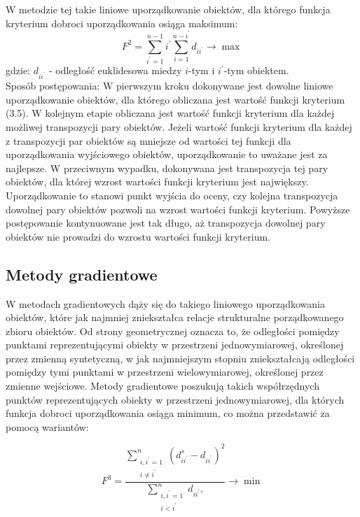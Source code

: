 \documentclass[12pt,a4paper]{report}
\begin{document}
W metodzie tej takie liniowe uporządkowanie obiektów, dla którego funkcja kryterium dobroci uporządkowania osiąga maksimum:
\begin{equation}
F^{2}=\sum_{i^{'}=1}^{n-1} i^{'}\sum_{i=1}^{n-i^{'}} d_{ii^{'}} \rightarrow     \max  
\end{equation}
gdzie:
\newline
$d_{ii^{'}}$ - odległość euklidesowa miedzy $i$-tym i $i^{'}$-tym obiektem.\\
Sposób postępowania:
\newline
W pierwszym kroku dokonywane jest dowolne liniowe uporządkowanie obiektów, dla którego obliczana jest wartość funkcji kryterium (3.5). W kolejnym etapie obliczana jest wartość funkcji kryterium dla każdej możliwej transpozycji pary obiektów. Jeżeli wartość funkcji kryterium dla każdej z transpozycji par obiektów są mniejsze od wartości tej funkcji dla uporządkowania wyjściowego obiektów, uporządkowanie to uważane jest za najlepsze. W przeciwnym wypadku, dokonywana jest transpozycja tej pary obiektów, dla której wzrost wartości funkcji kryterium jest największy. 
\newline
Uporządkowanie to stanowi punkt wyjścia do oceny, czy kolejna transpozycja dowolnej pary obiektów pozwoli na wzrost wartości funkcji kryterium. Powyższe postępowanie kontynuowane jest tak długo, aż transpozycja dowolnej pary obiektów nie prowadzi do wzrostu wartości funkcji kryterium. 

\subsection{Metody gradientowe} %
\noindent

W metodach gradientowych dąży się do takiego liniowego uporządkowania obiektów, które jak najmniej zniekształca relacje strukturalne porządkowanego zbioru obiektów. Od strony geometrycznej oznacza to, że odległości pomiędzy punktami reprezentującymi obiekty w przestrzeni jednowymiarowej, określonej przez zmienną syntetyczną, w jak najmniejszym stopniu zniekształcają odległości pomiędzy tymi punktami w przestrzeni wielowymiarowej, określonej przez zmienne wejściowe. Metody gradientowe poszukują takich współrzędnych punktów reprezentujących obiekty w przestrzeni jednowymiarowej, dla których funkcja dobroci uporządkowania osiąga minimum, co można przedstawić za pomocą wariantów:
 
\begin{equation}
F^{3}=\frac{\sum_{\substack{i,i^{'}=1\\i \neq i^{'}}}^{n} (d_{ii^{'}}^{s} - d_{ii^{'}})^2 }{\sum_{\substack{i,i^{'}=1 \\ i<i^{'}}}^{n} d_{ii^{'}}, } \rightarrow     \min  
\end{equation}
\end{document}
